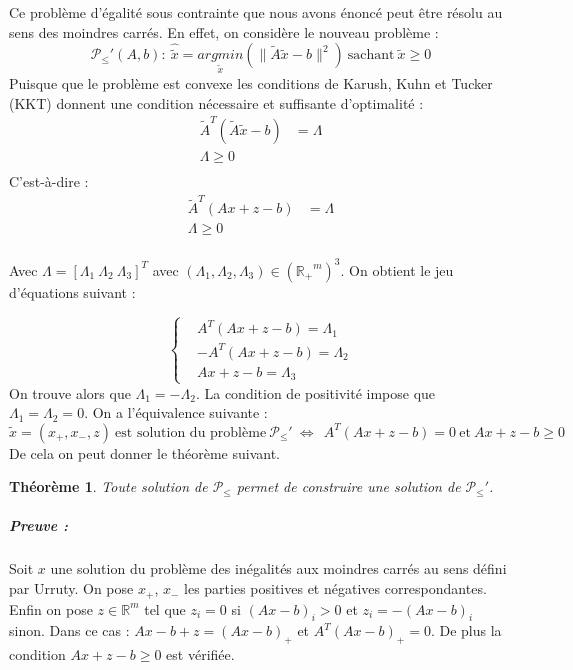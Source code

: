 \documentclass[10pt,a4paper]{article}
\newtheorem{thm}{Théorème}
\begin{document}
Ce problème d'égalité sous contrainte que nous avons énoncé peut être résolu au sens des moindres carrés. En effet, on considère le nouveau problème :
\begin{equation}
\mathcal{P}_{\le}'(A,b): \ \hat{\tilde{x}}=\underset{\tilde{x}}{argmin}( \|\tilde{A}\tilde{x} -b \|^2) \ \text{sachant} \ \tilde{x}\ge 0
\end{equation} 
Puisque que le problème est convexe les conditions de Karush, Kuhn et Tucker (KKT) donnent une condition nécessaire et suffisante d'optimalité :
\begin{equation}
\begin{aligned}
  \tilde{A}^T \left( \tilde{A}\tilde{x} - b \right) &= \Lambda\\
  \Lambda \geq 0\\
\end{aligned}
\end{equation}
C'est-à-dire :
\begin{equation}
\begin{aligned}
  \tilde{A}^T \left(Ax + z - b \right) &= \Lambda\\
  \Lambda \geq 0\\
  \end{aligned}
\end{equation}

Avec $\Lambda = \left[ \Lambda_1 \ \Lambda_2 \ \Lambda_3 \right]^T$ avec $(\Lambda_1, \Lambda_2, \Lambda_3) \in \left(\mathbb{R_+}^m \right)^3$. On obtient le jeu d'équations suivant :

\begin{equation}
\left\lbrace
\begin{aligned}
&A^T(Ax+z-b) = \Lambda_1 \\
&-A^T(Ax+z-b)= \Lambda_2 \\
&Ax+z-b = \Lambda_3
\end{aligned}
\right.
\end{equation}
On trouve alors que $\Lambda_1 = - \Lambda_2$. La condition de positivité impose que $\Lambda_1 = \Lambda_2 = 0$. On a l'équivalence suivante :
\begin{equation}
\tilde{x}=(x_+, x_-, z) \ \text{est solution du problème} \ \mathcal{P}_{\le}' \ \Leftrightarrow \ \ A^T(Ax+z-b)=0 \ \text{et} \ Ax+z-b \ge 0
\end{equation}
De cela on peut donner le théorème suivant.
\begin{thm}
Toute solution de $\mathcal{P}_{\le}$ permet de construire une solution de $\mathcal{P}_{\le}'$.
\end{thm}
\subparagraph{Preuve :} Soit $x$ une solution du problème des inégalités aux moindres carrés au sens défini par Urruty. On pose $x_+$, $x_-$ les parties positives et négatives correspondantes. Enfin on pose $z \in \mathbb{R}^m$ tel que $z_i=0$ si $(Ax-b)_i >0$ et $z_i= -(Ax-b)_i$ sinon. Dans ce cas : $Ax-b+z=(Ax-b)_+$ et $A^T(Ax-b)_+=0$. De plus la condition $Ax+z-b \ge 0$ est vérifiée.
\end{document}
